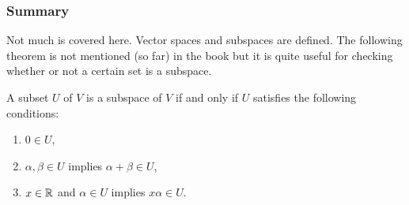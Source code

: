 \documentclass[../../main.tex]{subfiles}
\begin{document}
\subsubsection{Summary}
Not much is covered here. Vector spaces and subspaces are defined.
The following theorem is not mentioned (so far) in the book but it is quite useful for checking whether or not a certain set is a subspace.
\begin{theorem}\label{subspace:1}
	A subset $U$ of $V$ is a subspace of $V$ if and only if $U$ satisfies the following conditions:
	\begin{enumerate}
		\item $0 \in U$,
		\item $\alpha, \beta \in U$ implies $\alpha + \beta \in U$,
		\item $x \in \mathbb{R}$ and $\alpha \in U$ implies $x\alpha \in U$.
	\end{enumerate}
\end{theorem}
\end{document}
